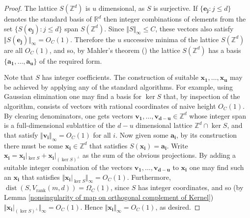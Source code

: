 \documentclass[12pt,a4paper,twoside,reqno]{amsart}
\newcommand{\rank}{\operatorname{rank}}
\newcommand{\dist}{\operatorname{dist}}
\numberwithin{equation}{section}
\begin{document}
\begin{proof}
The lattice $S(\mathbb{Z}^d)$ is $u$ dimensional, as $S$ is surjective. If $\{ \mathbf{e_j}:j\leqslant d\}$ denotes the standard basis of $\mathbb{R}^d$ then integer combinations of elements from the set $\{S(\mathbf{e_j}):j\leqslant d\}$ span $S(\mathbb{Z}^d)$. Since $\Vert S\Vert_\infty \leqslant C$, these vectors also satisfy $\Vert  S(\mathbf{e_j})\Vert_\infty = O_{C}(1)$. Therefore the $u$ successive minima of the lattice $S(\mathbb{Z}^d)$ are all $O_{C}(1)$, and so, by Mahler's theorem (\cite[Theorem 3.34]{TaVu06}) the lattice $S(\mathbb{Z}^d)$ has a basis $\{\mathbf{a_1},\dots,\mathbf{a_u}\}$ of the required form. 

Note that $S$ has integer coefficients. The construction of suitable $\mathbf{x_1},\dots,\mathbf{x_u}$ may be achieved by applying any of the standard algorithms. For example, using Gaussian elimination one may find a basis for $\ker S$ that, by inspection of the algorithm, consists of vectors with rational coordinates of naive height $O_C(1)$. By clearing denominators, one gets vectors $\mathbf{v_1},\dots,\mathbf{v_{d-u}} \in \mathbb{Z}^d$ whose integer span is a full-dimensional sublattice of the $d-u$ dimensional lattice $\mathbb{Z}^d \cap \ker S$, and that satisfy $\Vert \mathbf{v_i}\Vert_\infty = O_{C}(1)$ for all $i$. Now given some $\mathbf{a_i}$, by its construction there must be some $\mathbf{x_i} \in \mathbb{Z}^d$ that satisfies $S(\mathbf{x_i}) = \mathbf{a_i}$. Write $\mathbf{x_i} = \mathbf{x_i}|_{\ker S} + \mathbf{x_i} |_{(\ker S)^\perp}$ as the sum of the obvious projections. By adding a suitable integer combination of the vectors $\mathbf{v_1},\dots,\mathbf{v_{d-u}}$ to $\mathbf{x_i}$ one may find such an $\mathbf{x_i}$ that satisfies $\Vert\mathbf{x_i}|_{\ker S}\Vert_\infty = O_{C}(1)$. Furthermore, $\dist(S,V_{\rank}(m,d)) = \Omega_C(1)$, since $S$ has integer coordinates, and so (by Lemma \ref{nonsingularity of map on orthogonal complement of Kernel}) $\Vert \mathbf{x_i} |_{(\ker S)^\perp}\Vert_\infty = O_{C}(1)$. Hence $\Vert \mathbf{x_i}\Vert_\infty = O_{C}(1)$, as desired. 
\end{proof}
\end{document}

